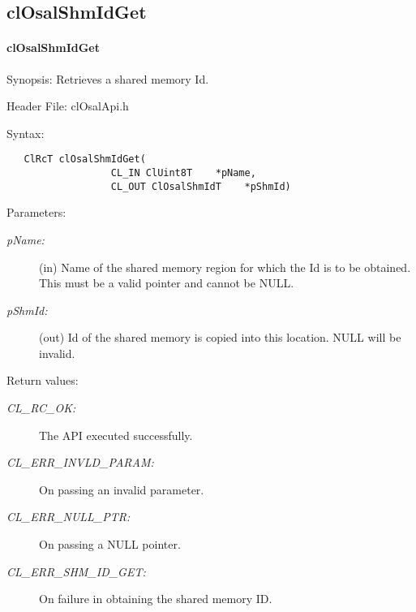 \subsection{clOsalShmIdGet} 
\hypertarget{pageosal146}{}\paragraph{cl\-Osal\-Shm\-Id\-Get}\label{pageosal146}
\begin{Desc}
\item[Synopsis:]Retrieves a shared memory Id.\end{Desc}
\begin{Desc}
\item[Header File:]clOsalApi.h\end{Desc}
\begin{Desc}
\item[Syntax:]

\footnotesize\begin{verbatim}   ClRcT clOsalShmIdGet(
                  CL_IN ClUint8T    *pName,
                  CL_OUT ClOsalShmIdT    *pShmId)
\end{verbatim}
\normalsize
\end{Desc}
\begin{Desc}
\item[Parameters:]
\begin{description}
\item[{\em p\-Name:}](in) Name of the shared memory region for which the Id is to be obtained. This must be a valid pointer and cannot be NULL.
\item[{\em p\-Shm\-Id:}](out) Id of the shared memory is copied into this location. NULL will be invalid.\end{description}
\end{Desc}
\begin{Desc}
\item[Return values:]
\begin{description}
\item[{\em CL\_\-RC\_\-OK:}]The API executed successfully. \item[{\em CL\_\-ERR\_\-INVLD\_\-PARAM:}]On passing an invalid parameter. \item[{\em CL\_\-ERR\_\-NULL\_\-PTR:}]On passing a NULL pointer. \item[{\em CL\_\-ERR\_\-SHM\_\-ID\_\-GET:}]On failure in obtaining the shared memory ID.\end{description}
\end{Desc}
